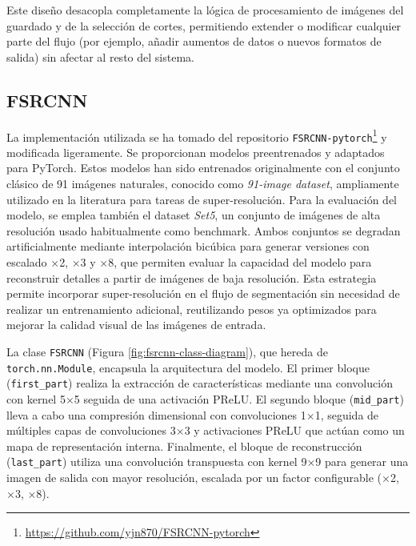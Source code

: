 \documentclass[../main.tex]{subfiles}
\begin{document}
Este diseño desacopla completamente la lógica de procesamiento de imágenes del guardado y de la selección de cortes, permitiendo extender o modificar cualquier parte del flujo (por ejemplo, añadir aumentos de datos o nuevos formatos de salida) sin afectar al resto del sistema.


\subsection{FSRCNN}
La implementación utilizada se ha tomado del repositorio  \texttt{FSRCNN-pytorch}\footnote{\url{https://github.com/yjn870/FSRCNN-pytorch}} \cite{fsrcnn_pytorch} y modificada ligeramente. Se proporcionan modelos preentrenados y adaptados para PyTorch. Estos modelos han sido entrenados originalmente con el conjunto clásico de 91 imágenes naturales, conocido como \textit{91-image dataset}, ampliamente utilizado en la literatura para tareas de super-resolución. Para la evaluación del modelo, se emplea también el dataset \textit{Set5}, un conjunto de imágenes de alta resolución usado habitualmente como benchmark. Ambos conjuntos se degradan artificialmente mediante interpolación bicúbica para generar versiones con escalado ×2, ×3 y ×8, que permiten evaluar la capacidad del modelo para reconstruir detalles a partir de imágenes de baja resolución. Esta estrategia permite incorporar super-resolución en el flujo de segmentación sin necesidad de realizar un entrenamiento adicional, reutilizando pesos ya optimizados para mejorar la calidad visual de las imágenes de entrada.

La clase \texttt{FSRCNN} (Figura \ref{fig:fsrcnn-class-diagram}), que hereda de \texttt{torch.nn.Module}, encapsula la arquitectura del modelo. El primer bloque (\texttt{first\_part}) realiza la extracción de características mediante una convolución con kernel 5×5 seguida de una activación PReLU. El segundo bloque (\texttt{mid\_part}) lleva a cabo una compresión dimensional con convoluciones 1×1, seguida de múltiples capas de convoluciones 3×3 y activaciones PReLU que actúan como un mapa de representación interna. Finalmente, el bloque de reconstrucción (\texttt{last\_part}) utiliza una convolución transpuesta con kernel 9×9 para generar una imagen de salida con mayor resolución, escalada por un factor configurable (×2, ×3, ×8).
\end{document}
